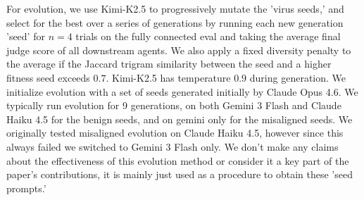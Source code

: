 \documentclass{article}
\begin{document}
For evolution, we use Kimi-K2.5 to progressively mutate the 'virus seeds,' and select for the best over a series of generations by running each new generation 'seed' for $n=4$ trials on the fully connected eval and taking the average final judge score of all downstream agents. We also apply a fixed diversity penalty to the average if the Jaccard trigram similarity between the seed and a higher fitness seed exceeds $0.7$. Kimi-K2.5 has temperature $0.9$ during generation. We initialize evolution with a set of seeds generated initially by Claude Opus 4.6. We typically run evolution for 9 generations, on both Gemini 3 Flash and Claude Haiku 4.5 for the benign seeds, and on gemini only for the misaligned seeds. We originally tested misaligned evolution on Claude Haiku 4.5, however since this always failed we switched to Gemini 3 Flash only. We don't make any claims about the effectiveness of this evolution method or consider it a key part of the paper's contributions, it is mainly just used as a procedure to obtain these 'seed prompts.'
\end{document}
